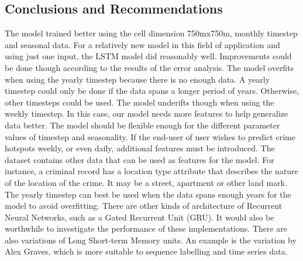 \documentclass[a0]{sciposter}
\begin{document}
\begin{multicols}{2}
    \section {Conclusions and Recommendations}
    The model trained better using the cell dimension 750mx750m, monthly timestep and seasonal data. For a relatively new model in this field of application and using just one input, the LSTM model did reasonably well. Improvements could be done though according to the results of the error analysis. The model overfits when using the yearly timestep because there is no enough data. A yearly timestep could only be done if the data spans a longer period of years. Otherwise, other timesteps could be used. The model underifts though when using the weekly timestep. In this case, our model needs more features to help generalize data better. The model should be flexible enough for the different parameter values of timestep and seasonality. If the end-user of user wishes to predict crime hotspots weekly, or even daily, additional features must be introduced. The dataset contains other data that can be used as features for the model. For instance, a criminal record has a location type attribute that describes the nature of the location of the crime. It may be a street, apartment or other land mark. The yearly timestep can best be used when the data spans enough years for the model to avoid overfitting. There are other kinds of architecture of Recurrent Neural Networks, such as a Gated Recurrent Unit (GRU). It would also be worthwhile to investigate the performance of these implementations. There are also variations of Long Short-term Memory units. An example is the variation by Alex Graves, which is more suitable to sequence labelling and time series data.

    \end{multicols}
\end{document}
